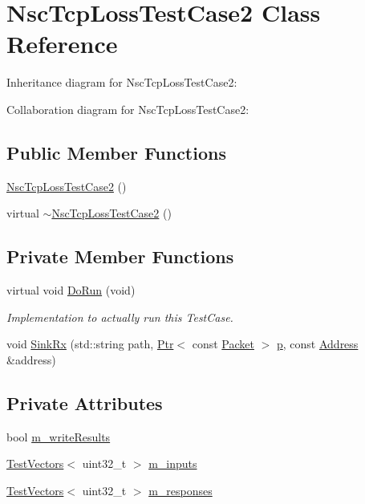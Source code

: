 \hypertarget{classNscTcpLossTestCase2}{}\section{Nsc\+Tcp\+Loss\+Test\+Case2 Class Reference}
\label{classNscTcpLossTestCase2}


Inheritance diagram for Nsc\+Tcp\+Loss\+Test\+Case2\+:


Collaboration diagram for Nsc\+Tcp\+Loss\+Test\+Case2\+:
\subsection*{Public Member Functions}
\begin{DoxyCompactItemize}
\item 
\hyperlink{classNscTcpLossTestCase2_a2d8f98307d2a568f2c568a57a61b0379}{Nsc\+Tcp\+Loss\+Test\+Case2} ()
\item 
virtual \hyperlink{classNscTcpLossTestCase2_a2d5a1d6293b0b72b58138da6a9322ae8}{$\sim$\+Nsc\+Tcp\+Loss\+Test\+Case2} ()
\end{DoxyCompactItemize}
\subsection*{Private Member Functions}
\begin{DoxyCompactItemize}
\item 
virtual void \hyperlink{classNscTcpLossTestCase2_ad364f063ed7754e73344898da12a442f}{Do\+Run} (void)
\begin{DoxyCompactList}\small\item\em Implementation to actually run this Test\+Case. \end{DoxyCompactList}\item 
void \hyperlink{classNscTcpLossTestCase2_aeef1e531cd0f4fd69dd40fad015594d3}{Sink\+Rx} (std\+::string path, \hyperlink{classns3_1_1Ptr}{Ptr}$<$ const \hyperlink{classns3_1_1Packet}{Packet} $>$ \hyperlink{lte__link__budget__x2__handover__measures_8m_ac9de518908a968428863f829398a4e62}{p}, const \hyperlink{classns3_1_1Address}{Address} \&address)
\end{DoxyCompactItemize}
\subsection*{Private Attributes}
\begin{DoxyCompactItemize}
\item 
bool \hyperlink{classNscTcpLossTestCase2_a9a6f06deb7a2687aaa2feafbf7c39fa4}{m\+\_\+write\+Results}
\item 
\hyperlink{classns3_1_1TestVectors}{Test\+Vectors}$<$ uint32\+\_\+t $>$ \hyperlink{classNscTcpLossTestCase2_aeec3235eed328a98fed8cbac38d06d01}{m\+\_\+inputs}
\item 
\hyperlink{classns3_1_1TestVectors}{Test\+Vectors}$<$ uint32\+\_\+t $>$ \hyperlink{classNscTcpLossTestCase2_ace5e314367a0b601262aaf186e172d30}{m\+\_\+responses}
\end{DoxyCompactItemize}
